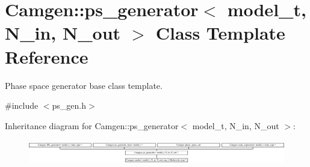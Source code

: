 \hypertarget{a00441}{\section{Camgen\-:\-:ps\-\_\-generator$<$ model\-\_\-t, N\-\_\-in, N\-\_\-out $>$ Class Template Reference}
\label{a00441}
}


Phase space generator base class template.  




{\ttfamily \#include $<$ps\-\_\-gen.\-h$>$}

Inheritance diagram for Camgen\-:\-:ps\-\_\-generator$<$ model\-\_\-t, N\-\_\-in, N\-\_\-out $>$\-:\begin{figure}[H]
\begin{center}
\leavevmode
\includegraphics[height=1.085271cm]{a00441}
\end{center}
\end{figure}

